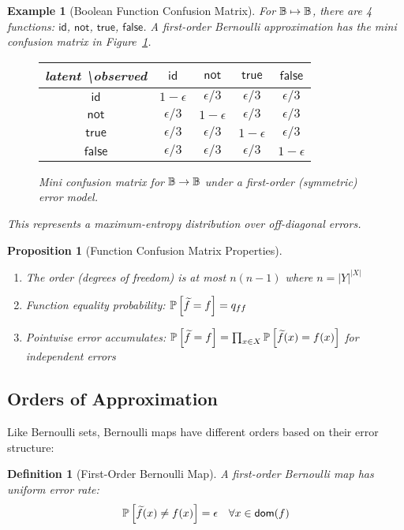 \documentclass[11pt,final,hidelinks]{article}
\newtheorem{proposition}[theorem]{Proposition}
\newtheorem{definition}[theorem]{Definition}
\newtheorem{example}[theorem]{Example}
\newcommand{\error}{\epsilon}
\newcommand{\Dom}{\mathsf{dom}}
\begin{document}
\begin{example}[Boolean Function Confusion Matrix]
For $\mathbb{B} \mapsto \mathbb{B}$, there are 4 functions: $\mathsf{id}$, $\mathsf{not}$, $\mathsf{true}$, $\mathsf{false}$. A first-order Bernoulli approximation has the mini confusion matrix in Figure~\ref{fig:bool-func-confusion}.
\begin{figure}[t]
\centering
\begin{tabular}{c|cccc}
latent \textbackslash observed & $\mathsf{id}$ & $\mathsf{not}$ & $\mathsf{true}$ & $\mathsf{false}$ \\
\hline
$\mathsf{id}$ & $1-\epsilon$ & $\epsilon/3$ & $\epsilon/3$ & $\epsilon/3$ \\
$\mathsf{not}$ & $\epsilon/3$ & $1-\epsilon$ & $\epsilon/3$ & $\epsilon/3$ \\
$\mathsf{true}$ & $\epsilon/3$ & $\epsilon/3$ & $1-\epsilon$ & $\epsilon/3$ \\
$\mathsf{false}$ & $\epsilon/3$ & $\epsilon/3$ & $\epsilon/3$ & $1-\epsilon$
\end{tabular}
\caption{Mini confusion matrix for $\mathbb{B}\to\mathbb{B}$ under a first-order (symmetric) error model.}
\label{fig:bool-func-confusion}
\end{figure}
This represents a maximum-entropy distribution over off-diagonal errors.
\end{example}

\begin{proposition}[Function Confusion Matrix Properties]
\begin{enumerate}
    \item The order (degrees of freedom) is at most $n(n-1)$ where $n = |Y|^{|X|}$
    \item Function equality probability: $\mathbb{P}\left[\widetilde{f} = f\right] = q_{ff}$
    \item Pointwise error accumulates: $\mathbb{P}\left[\widetilde{f} = f\right] = \prod_{x \in X} \mathbb{P}\left[\widetilde{f}(x) = f(x)\right]$ for independent errors
\end{enumerate}
\end{proposition}

\subsection{Orders of Approximation}

Like Bernoulli sets, Bernoulli maps have different orders based on their error structure:

\begin{definition}[First-Order Bernoulli Map]
A first-order Bernoulli map has uniform error rate:
\begin{equation}
\Prob{\obs{f}(x) \neq f(x)} = \error \quad \forall x \in \Dom(f)
\end{equation}
\end{definition}
\end{document}
